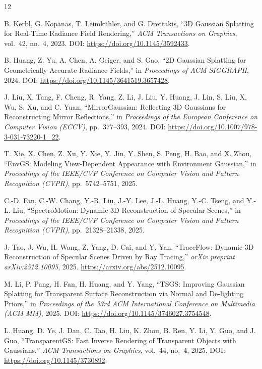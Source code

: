 \begin{thebibliography}{12}

B. Kerbl, G. Kopanas, T. Leimk{\"u}hler, and G. Drettakis,
``3D Gaussian Splatting for Real-Time Radiance Field Rendering,''
\emph{ACM Transactions on Graphics}, vol.~42, no.~4, 2023.
DOI: \url{https://doi.org/10.1145/3592433}.

B. Huang, Z. Yu, A. Chen, A. Geiger, and S. Gao,
``2D Gaussian Splatting for Geometrically Accurate Radiance Fields,''
in \emph{Proceedings of ACM SIGGRAPH}, 2024.
DOI: \url{https://doi.org/10.1145/3641519.3657428}.

J. Liu, X. Tang, F. Cheng, R. Yang, Z. Li, J. Liu, Y. Huang, J. Lin, S. Liu, X. Wu, S. Xu, and C. Yuan,
``MirrorGaussian: Reflecting 3D Gaussians for Reconstructing Mirror Reflections,''
in \emph{Proceedings of the European Conference on Computer Vision (ECCV)}, pp.~377--393, 2024.
DOI: \url{https://doi.org/10.1007/978-3-031-73220-1_22}.

T. Xie, X. Chen, Z. Xu, Y. Xie, Y. Jin, Y. Shen, S. Peng, H. Bao, and X. Zhou,
``EnvGS: Modeling View-Dependent Appearance with Environment Gaussian,''
in \emph{Proceedings of the IEEE/CVF Conference on Computer Vision and Pattern Recognition (CVPR)}, pp.~5742--5751, 2025.

C.-D. Fan, C.-W. Chang, Y.-R. Liu, J.-Y. Lee, J.-L. Huang, Y.-C. Tseng, and Y.-L. Liu,
``SpectroMotion: Dynamic 3D Reconstruction of Specular Scenes,''
in \emph{Proceedings of the IEEE/CVF Conference on Computer Vision and Pattern Recognition (CVPR)}, pp.~21328--21338, 2025.

J. Tao, J. Wu, H. Wang, Z. Yang, D. Cai, and Y. Yan,
``TraceFlow: Dynamic 3D Reconstruction of Specular Scenes Driven by Ray Tracing,''
\emph{arXiv preprint arXiv:2512.10095}, 2025.
\url{https://arxiv.org/abs/2512.10095}.

M. Li, P. Pang, H. Fan, H. Huang, and Y. Yang,
``TSGS: Improving Gaussian Splatting for Transparent Surface Reconstruction via Normal and De-lighting Priors,''
in \emph{Proceedings of the 33rd ACM International Conference on Multimedia (ACM MM)}, 2025.
DOI: \url{https://doi.org/10.1145/3746027.3754548}.

L. Huang, D. Ye, J. Dan, C. Tao, H. Liu, K. Zhou, B. Ren, Y. Li, Y. Guo, and J. Guo,
``TransparentGS: Fast Inverse Rendering of Transparent Objects with Gaussians,''
\emph{ACM Transactions on Graphics}, vol.~44, no.~4, 2025.
DOI: \url{https://doi.org/10.1145/3730892}.


\end{thebibliography}
